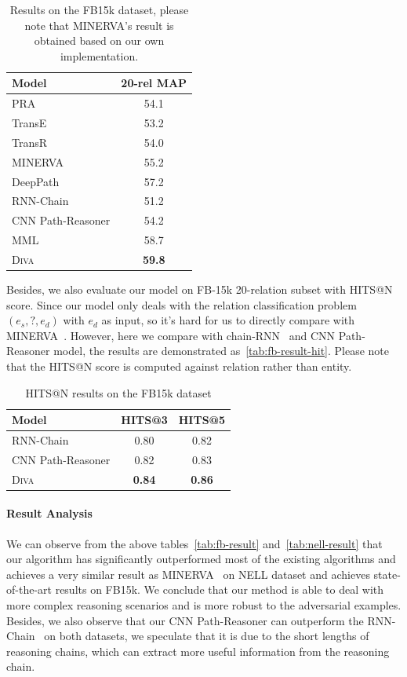 \documentclass[11pt,a4paper]{article}
\begin{document}
\begin{table}[t]
\centering
\small
\begin{tabular}{|l|c|}
\hline
Model & 20-rel MAP\\
\hline
PRA~\cite{lao2011random} & 54.1\\
\hline
TransE~\cite{bordes2013translating} & 53.2 \\
\hline
TransR~\cite{lin2015learning} & 54.0 \\
\hline
MINERVA~\cite{das2017go} & 55.2 \\
\hline
DeepPath~\cite{xiong2017deeppath} & 57.2 \\
\hline
RNN-Chain~\cite{das2016chains} & 51.2 \\
\hline
\hline
CNN Path-Reasoner & 54.2 \\
\hline
MML~\cite{guu2017language} & 58.7 \\
\hline
\textsc{Diva} & \textbf{59.8} \\
\hline
\end{tabular}
\caption{Results on the FB15k dataset, please note that MINERVA's result is obtained based on our own implementation.}
\label{tab:fb-result}
\end{table}
Besides, we also evaluate our model on FB-15k 20-relation subset with HITS@N score. Since our model only deals with the relation classification problem $(e_s, ?, e_d)$ with $e_d$ as input, so it's hard for us to directly compare with MINERVA~\cite{das2017go}. However, here we compare with chain-RNN~\cite{das2016chains} and CNN Path-Reasoner model, the results are demonstrated as~\autoref{tab:fb-result-hit}. Please note that the HITS@N score is computed against relation rather than entity.
\begin{table}[!htb]
\small
\centering
\begin{tabular}{|l|c|c|}
\hline
Model & HITS@3 & HITS@5\\
\hline
RNN-Chain~\cite{das2016chains} & 0.80 & 0.82\\
\hline
CNN Path-Reasoner & 0.82 & 0.83 \\
\hline
\textsc{Diva} & \textbf{0.84} & \textbf{0.86}\\
\hline
\end{tabular}
\caption{HITS@N results on the FB15k dataset}
\label{tab:fb-result-hit}
\end{table}

\paragraph{Result Analysis}
We can observe from the above tables~\autoref{tab:fb-result} and~\autoref{tab:nell-result} that our algorithm has significantly outperformed most of the existing algorithms and achieves a very similar result as MINERVA~\cite{das2017go} on NELL dataset and achieves state-of-the-art results on FB15k. We conclude that our method is able to deal with more complex reasoning scenarios and is more robust to the adversarial examples. Besides, we also observe that our CNN Path-Reasoner can outperform the RNN-Chain~\cite{das2016chains} on both datasets, we speculate that it is due to the short lengths of reasoning chains, which can extract more useful information from the reasoning chain. 
\end{document}
